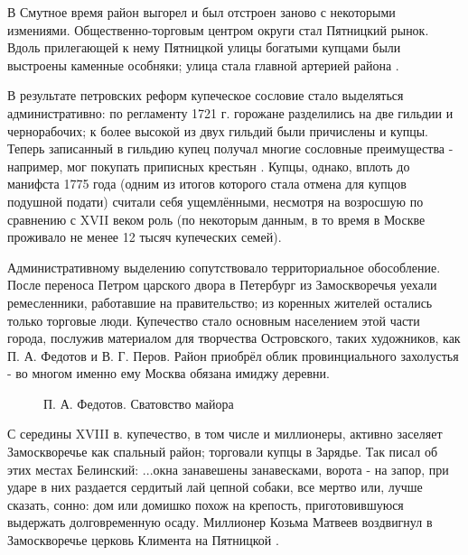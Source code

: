 \documentclass[a4paper,12pt]{article}
\begin{document}
\color{black}

В Смутное время район выгорел и был отстроен заново с некоторыми измениями. Общественно-торговым центром округи стал Пятницкий рынок. Вдоль прилегающей к нему Пятницкой улицы богатыми купцами были выстроены каменные особняки; улица стала главной артерией района \cite{zamosk}.\\
\color{red}

\color{black}


\color{black}
В результате петровских реформ купеческое сословие стало выделяться административно: по регламенту 1721 г. горожане разделились на две гильдии и чернорабочих; к более высокой из двух гильдий были причислены и купцы. Теперь записанный в гильдию купец получал многие сословные преимущества - например, мог покупать приписных крестьян \cite{burishk}. Купцы, однако, вплоть до манифста 1775 года (одним из итогов которого стала отмена для купцов подушной подати) считали себя ущемлёнными, несмотря на возросшую по сравнению с XVII веком роль (по некоторым данным, в то время в Москве проживало не менее 12 тысяч купеческих семей).

Административному выделению сопутствовало территориальное обособление. После переноса Петром царского двора в Петербург из Замоскворечья уехали ремесленники, работавшие на правительство; из коренных жителей остались только торговые люди. Купечество стало основным населением этой части города, послужив материалом для творчества Островского, таких художников, как П. А. Федотов и В. Г. Перов.  Район приобрёл облик провинциального захолустья - во многом именно ему Москва обязана имиджу  деревни\rk \cite{zamosk}.

\begin{figure}[h!]
\caption{П. А. Федотов. Сватовство майора}
\end{figure}

С середины XVIII в. купечество, в том числе и миллионеры, активно заселяет Замоскворечье как спальный район; торговали купцы в Зарядье. Так писал об этих местах Белинский: \lk...окна занавешены занавесками, ворота - на запор, при ударе в них раздается сердитый лай цепной собаки, все мертво или, лучше сказать, сонно: дом или домишко похож на крепость, приготовившуюся выдержать долговременную осаду\rk. Миллионер Козьма Матвеев воздвигнул в Замоскворечье церковь Климента на Пятницкой \cite{zamosk}.\\
\end{document}
